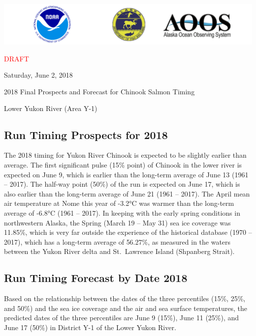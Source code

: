 \documentclass[]{article}
\title{}
\author{}
\date{}
\begin{document}
\includegraphics{images/combined.png}

\textcolor{red}{\large{DRAFT}}

Saturday, June 2, 2018

\begin{center}
  \huge{2018 Final Prospects and Forecast for Chinook Salmon Timing}
  
  \large{Lower Yukon River (Area Y-1)}
\end{center}

\hypertarget{run-timing-prospects-for-2018}{%
\subsection{Run Timing Prospects for
2018}\label{run-timing-prospects-for-2018}}

The 2018 timing for Yukon River Chinook is expected to be slightly
earlier than average. The first significant pulse (15\% point) of
Chinook in the lower river is expected on June 9, which is earlier than
the long-term average of June 13 (1961 -- 2017). The half-way point
(50\%) of the run is expected on June 17, which is also earlier than the
long-term average of June 21 (1961 -- 2017). The April mean air
temperature at Nome this year of -3.2°C was warmer than the long-term
average of -6.8°C (1961 -- 2017). In keeping with the early spring
conditions in northwestern Alaska, the Spring (March 19 -- May 31) sea
ice coverage was 11.85\%, which is very far outside the experience of
the historical database (1970 -- 2017), which has a long-term average of
56.27\%, as measured in the waters between the Yukon River delta and
St.~Lawrence Island (Shpanberg Strait).

\hypertarget{run-timing-forecast-by-date-2018}{%
\subsection{Run Timing Forecast by Date
2018}\label{run-timing-forecast-by-date-2018}}

Based on the relationship between the dates of the three percentiles
(15\%, 25\%, and 50\%) and the sea ice coverage and the air and sea
surface temperatures, the predicted dates of the three percentiles are
June 9 (15\%), June 11 (25\%), and June 17 (50\%) in District Y-1 of the
Lower Yukon River.
\end{document}
